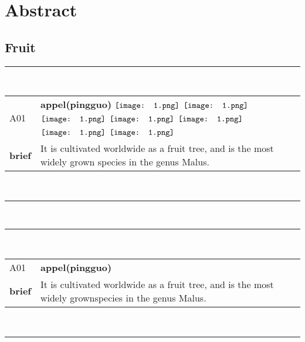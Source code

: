 \section*{\centering\huge{Abstract}}
\subsection{\Large Fruit}
\vspace{-10pt}
\rule{\textwidth}{0.8mm} \\[0.2cm]
\begin{tabularx}{\textwidth}{lX}
    \small{A0}1&
    \large{\bfseries{appel(pingguo)}}\hfill
    $\vcenter{\hbox{\texttt{[image: 1.png]}}}$
    $\vcenter{\hbox{\texttt{[image: 1.png]}}}$
    $\vcenter{\hbox{\texttt{[image: 1.png]}}}$
    $\vcenter{\hbox{\texttt{[image: 1.png]}}}$
    $\vcenter{\hbox{\texttt{[image: 1.png]}}}$
    $\vcenter{\hbox{\texttt{[image: 1.png]}}}$
    $\vcenter{\hbox{\texttt{[image: 1.png]}}}$
    \\[10pt]
    \large{\bfseries{brief}}&\noindent\parbox[c]{\hsize}{It is cultivated worldwide as a fruit tree, and is the most widely grown species in the genus Malus.} \\
\end{tabularx}
\\[5pt]
\rule{\textwidth}{0.8mm} \\[-8pt]
\rule{\textwidth}{0.8mm} \\[0.2cm]
\begin{tabularx}{\textwidth}{lX}
    \small{A0}1&\large{\bfseries{appel(pingguo)}}\\[10pt]
    \large{\bfseries{brief}}&\noindent\parbox[c]{\hsize}{It is cultivated worldwide as a fruit tree, and is the most widely grownspecies in the genus Malus.} \\
\end{tabularx}
\vspace{0pt}\\
\rule{\textwidth}{0.8mm} \\[1pt]

